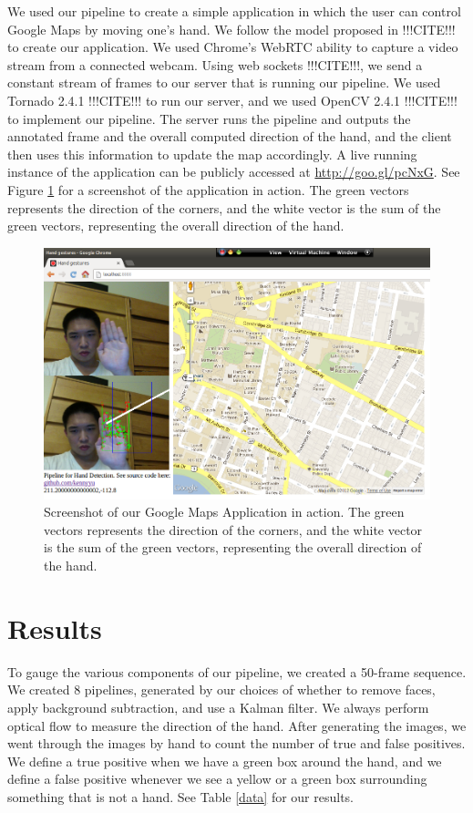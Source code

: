 \documentclass[12pt]{article}
\begin{document}
We used our pipeline to create a simple application in which the user can control Google Maps by moving one's hand. We follow the model proposed in !!!CITE!!! to create our application. We used Chrome's WebRTC ability to capture a video stream from a connected webcam. Using web sockets !!!CITE!!!, we send a constant stream of frames to our server that is running our pipeline. We used Tornado 2.4.1 !!!CITE!!! to run our server, and we used OpenCV 2.4.1 !!!CITE!!! to implement our pipeline. The server runs the pipeline and outputs the annotated frame and the overall computed direction of the hand, and the client then uses this information to update the map accordingly. A live running instance of the application can be publicly accessed at \url{http://goo.gl/pcNxG}. See Figure \ref{map} for a screenshot of the application in action. The green vectors represents the direction of the corners, and the white vector is the sum of the green vectors, representing the overall direction of the hand.

\noindent\begin{figure}[H]
\centering
\includegraphics[scale=0.45]{map.png}
\caption{Screenshot of our Google Maps Application in action. The green vectors represents the direction of the corners, and the white vector is the sum of the green vectors, representing the overall direction of the hand.}
\label{map}
\end{figure}

\section{Results}

To gauge the various components of our pipeline, we created a 50-frame sequence. We created 8 pipelines, generated by our choices of whether to remove faces, apply background subtraction, and use a Kalman filter. We always perform optical flow to measure the direction of the hand. After generating the images, we went through the images by hand to count the number of true and false positives. We define a true positive when we have a green box around the hand, and we define a false positive whenever we see a yellow or a green box surrounding something that is not a hand. See Table \ref{data} for our results.
\end{document}
